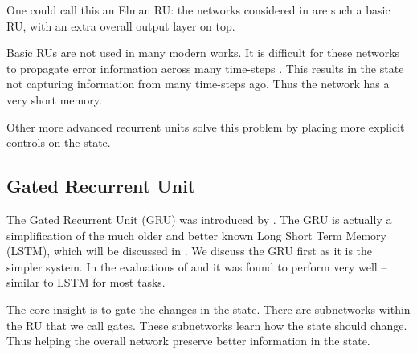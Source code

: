 \documentclass[12pt,parskip]{komatufte}
\begin{document}
One could call this an Elman RU:
the networks considered in  are such a basic RU, with an extra overall output layer on top.

Basic RUs are not used in many modern works.
It is difficult for these networks to propagate error information across many time-steps .
This results in the state not capturing information from many time-steps ago.
Thus the network has a very short memory.

Other more advanced recurrent units solve this problem by placing more explicit controls on the state.

\subsection{Gated Recurrent Unit}
The Gated Recurrent Unit (GRU) was introduced by .
The GRU is actually a simplification of the much older and better known Long Short Term Memory (LSTM),
which will be discussed in .
We discuss the GRU first as it is the simpler system.
In the evaluations of  and  it was found to perform very well -- similar to LSTM for most tasks.

The core insight is to gate the changes in the state.
There are subnetworks within the RU that we call gates.
These subnetworks learn how the state should change.
Thus helping the overall network preserve better information in the state.
\end{document}
